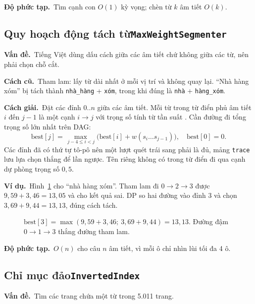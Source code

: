 \documentclass[9pt,twocolumn,a4paper]{extarticle}
\newcommand{\code}[1]{\texttt{#1}}
\newcommand{\dsa}[2]{\subsection[#1]{#1\hfill{\normalfont\footnotesize\code{#2}}}}
\newcommand{\vande}{\textcolor{linkblue}{\textbf{Vấn đề.}}~}
\newcommand{\cachgiai}{\textcolor{linkblue}{\textbf{Cách giải.}}~}
\newcommand{\dpt}{\textcolor{linkblue}{\textbf{Độ phức tạp.}}~}
\newcommand{\cu}{\textcolor{linkblue}{\textbf{Cách cũ.}}~}
\newcommand{\vidu}{\textcolor{linkblue}{\textbf{Ví dụ.}}~}
\begin{document}
\dpt Tìm cạnh con $O(1)$ kỳ vọng; chèn từ $k$ âm tiết $O(k)$.

\dsa{Quy hoạch động tách từ}{MaxWeightSegmenter}
\vande Tiếng Việt dùng dấu cách giữa các âm tiết chứ không giữa các từ, nên phải chọn chỗ cắt.

\cu Tham lam: lấy từ dài nhất ở mỗi vị trí và không quay lại. ``Nhà hàng xóm'' bị tách thành \code{nhà\_hàng} + \code{xóm}, trong khi đúng là \code{nhà} + \code{hàng\_xóm}.

\cachgiai Đặt các đỉnh $0..n$ giữa các âm tiết. Mỗi từ trong từ điển phủ âm tiết $i$ đến $j-1$ là một cạnh $i\to j$ với trọng số tính từ tần suất \cite{coccoctokenizer}. Cần đường đi tổng trọng số lớn nhất trên DAG:
\begin{equation}
\text{best}[j]=\max_{\,j-4\le i<j}\big(\text{best}[i]+w(s_i\dots s_{j-1})\big),\quad \text{best}[0]=0.
\label{eq:dp}
\end{equation}
Các đỉnh đã có thứ tự tô-pô nên một lượt quét trái sang phải là đủ, mảng \code{trace} lưu lựa chọn thắng để lần ngược. Tên riêng không có trong từ điển đi qua cạnh dự phòng trọng số $0{,}5$.

\vidu Hình~\ref{fig:dag} cho ``nhà hàng xóm''. Tham lam đi $0\to2\to3$ được $9{,}59+3{,}46=13{,}05$ và cho kết quả sai. DP so hai đường vào đỉnh 3 và chọn $3{,}69+9{,}44=13{,}13$, đúng cách tách.

\begin{figure}[H]
\centering
{}
\caption{$\text{best}[3]=\max(9{,}59+3{,}46;\ 3{,}69+9{,}44)=13{,}13$. Đường đậm $0\to1\to3$ thắng đường tham lam.}
\label{fig:dag}
\end{figure}

\dpt $O(n)$ cho câu $n$ âm tiết, vì mỗi ô chỉ nhìn lùi tối đa 4 ô.

\dsa{Chỉ mục đảo}{InvertedIndex}
\vande Tìm các trang chứa một từ trong 5.011 trang.
\end{document}
